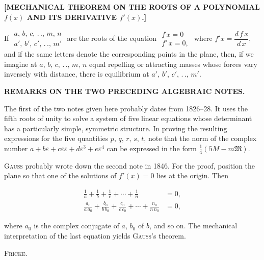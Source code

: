 \clearpage
{}

\begin{center}
\textbf{[MECHANICAL THEOREM ON THE ROOTS OF A POLYNOMIAL
$f(x)$ AND ITS DERIVATIVE $f'(x)$.]}
\end{center}

\noindent\hspace*{\parindent}If $\begin{array}{c}a,\,b,\,c,\,.\,.,\,m,\,n\\ a',\,b',\,c',\,.\,.,\,m'\end{array}$ are the
roots of the equation $\begin{array}{c}f\,x=0\\ f'\,x=0,\end{array}$ where $f'x=\dfrac{d\,f\,x}{d\,x}$,
and if the same letters denote the corresponding points in the plane, then, if
we imagine at $a,\,b,\,c,\,.\,.,\,m,\,n$ equal repelling or attracting masses whose forces vary inversely
with distance, there is equilibrium at $a',\,b',\,c',\,.\,.,\,m'$.

\begin{center}
\textbf{REMARKS ON THE TWO PRECEDING ALGEBRAIC NOTES.}
\end{center}

\noindent\hspace*{\parindent}The first of the two notes given here probably dates from 1826--28. It uses the fifth roots of
unity to solve a system of five linear equations whose determinant has a particularly simple,
symmetric structure. In proving the resulting expressions
for the five quantities $p,\,q,\,r,\,s,\,t$, note
that the norm of the complex number $a+b\varepsilon+c\varepsilon\varepsilon+d\varepsilon^3+e\varepsilon^4$
can be expressed in the form $\frac{1}{4}(5M-m\mathfrak{M})$. 

\textsc{Gauss} probably wrote down the second note in 1846. For the proof,
position the plane so that one of the solutions of $f'(x)=0$ lies at the origin.
Then

\[
\begin{aligned}
\frac{1}{a}+\frac{1}{b}+\frac{1}{c}+\cdots+\frac{1}{n}&=0,\\[3pt]
\frac{a_0}{a\,a_0}+\frac{b_0}{b\,b_0}+\frac{c_0}{c\,c_0}+\cdots+\frac{n_0}{n\,n_0}&=0,
\end{aligned}
\]

\noindent where $a_0$ is the complex conjugate of $a$, $b_0$ of $b$, and so on. The mechanical interpretation of the
last equation yields \textsc{Gauss}’s theorem.
\par\nobreak\hfill\textsc{Fricke.}\par


